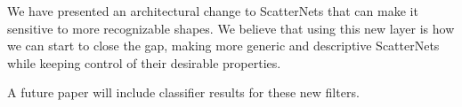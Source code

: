 We have presented an architectural change to ScatterNets that can make it
sensitive to more recognizable shapes. We believe that using this new layer is
how we can start to close the gap, making more generic and descriptive
ScatterNets while keeping control of their desirable properties. 

A future paper will include classifier results for these new filters.


